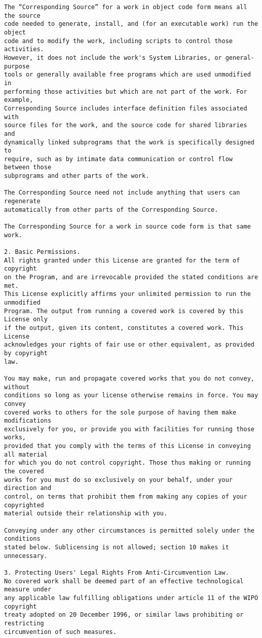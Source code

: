 \begin{verbatim}
The “Corresponding Source” for a work in object code form means all the source
code needed to generate, install, and (for an executable work) run the object
code and to modify the work, including scripts to control those activities.
However, it does not include the work's System Libraries, or general-purpose
tools or generally available free programs which are used unmodified in
performing those activities but which are not part of the work. For example,
Corresponding Source includes interface definition files associated with
source files for the work, and the source code for shared libraries and
dynamically linked subprograms that the work is specifically designed to
require, such as by intimate data communication or control flow between those
subprograms and other parts of the work.

The Corresponding Source need not include anything that users can regenerate
automatically from other parts of the Corresponding Source.

The Corresponding Source for a work in source code form is that same work.

2. Basic Permissions.
All rights granted under this License are granted for the term of copyright
on the Program, and are irrevocable provided the stated conditions are met.
This License explicitly affirms your unlimited permission to run the unmodified
Program. The output from running a covered work is covered by this License only
if the output, given its content, constitutes a covered work. This License
acknowledges your rights of fair use or other equivalent, as provided by copyright
law.

You may make, run and propagate covered works that you do not convey, without
conditions so long as your license otherwise remains in force. You may convey
covered works to others for the sole purpose of having them make modifications
exclusively for you, or provide you with facilities for running those works,
provided that you comply with the terms of this License in conveying all material
for which you do not control copyright. Those thus making or running the covered
works for you must do so exclusively on your behalf, under your direction and
control, on terms that prohibit them from making any copies of your copyrighted
material outside their relationship with you.

Conveying under any other circumstances is permitted solely under the conditions
stated below. Sublicensing is not allowed; section 10 makes it unnecessary.

3. Protecting Users' Legal Rights From Anti-Circumvention Law.
No covered work shall be deemed part of an effective technological measure under
any applicable law fulfilling obligations under article 11 of the WIPO copyright
treaty adopted on 20 December 1996, or similar laws prohibiting or restricting
circumvention of such measures.


\end{verbatim}
